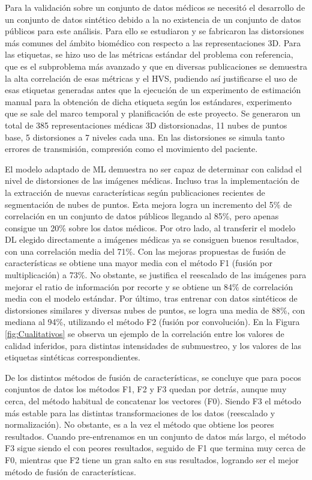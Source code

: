 Para la validación sobre un conjunto de datos médicos se necesitó el desarrollo 
de un conjunto de datos sintético debido a la no existencia de un conjunto de 
datos públicos para este análisis. Para ello se estudiaron y se fabricaron las distorsiones más 
comunes del ámbito biomédico con respecto a las representaciones 3D. Para las etiquetas, 
se hizo uso de las métricas estándar del problema con referencia, que es el subproblema 
más avanzado y que en diversas publicaciones se demuestra la alta correlación 
de esas métricas y el HVS, pudiendo así justificarse el uso de esas 
etiquetas generadas antes que la ejecución de un experimento de estimación 
manual para la obtención de dicha etiqueta según los estándares, experimento que se 
sale del marco temporal y planificación de este proyecto. Se generaron 
un total de 385 representaciones médicas 3D distorsionadas, 11 nubes de puntos 
base, 5 distorsiones a 7 niveles cada una. En las distorsiones se simula 
tanto errores de transmisión, compresión como el movimiento del paciente.

El modelo adaptado de ML demuestra no ser capaz de determinar con calidad 
el nivel de distorsiones de las imágenes médicas. Incluso tras la implementación 
de la extracción de nuevas características según publicaciones recientes 
de segmentación de nubes de puntos. Esta mejora logra un incremento del 5\% de correlación en un conjunto de datos públicos llegando al 85\%, pero apenas consigue un 20\% sobre los datos médicos. 
Por otro lado, al transferir el modelo DL elegido directamente a imágenes médicas ya se consiguen 
buenos resultados, con una correlación media del 71\%. Con las mejoras propuestas de 
fusión de características se obtiene una mayor media con el método F1 (fusión por multiplicación) a 73\%. 
No obstante, se justifica el reescalado de las imágenes para mejorar el 
ratio de información por recorte y se obtiene un 84\% de correlación media 
con el modelo estándar. Por último, tras entrenar con datos sintéticos de distorsiones similares y 
diversas nubes de puntos, se logra una media de 88\%, con mediana al 94\%, utilizando el método F2 (fusión por convolución).
En la Figura \ref{fig:Cualitativos} se observa un ejemplo de la correlación entre 
los valores de calidad inferidos, para distintas intensidades de submuestreo, 
y los valores de las etiquetas sintéticas correspondientes. 

De los distintos métodos de fusión de características, se concluye que para 
pocos conjuntos de datos los métodos F1, F2 y F3 quedan por detrás, aunque 
muy cerca, del método habitual de concatenar los vectores (F0). Siendo F3 el método 
más estable para las distintas transformaciones de los datos (reescalado y normalización). 
No obstante, es a la vez el método que obtiene los peores resultados. 
Cuando pre-entrenamos en un conjunto de datos más largo, el método F3 sigue siendo 
el con peores resultados, seguido de F1 que termina muy cerca de F0, mientras que F2 
tiene un gran salto en sus resultados, logrando ser el mejor método de fusión de 
características. 

